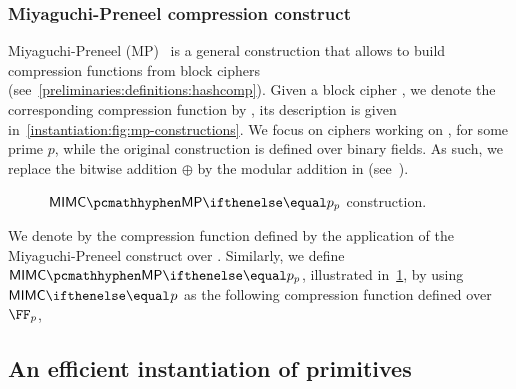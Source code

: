 \subsubsection{Miyaguchi-Preneel compression construct}

Miyaguchi-Preneel (MP)~\cite[$f_3$ function]{black2002black} is a general construction that allows to build compression functions from block ciphers (see~\cref{preliminaries:definitions:hashcomp}). Given a block cipher \Enc, we denote the corresponding compression function by \fMP{}, its description is given in~\cref{instantiation:fig:mp-constructions}. We focus on ciphers working on , for some prime $p$, while the original construction is defined over binary fields. As such, we replace the bitwise addition $\oplus$ by the modular addition in \FFx{\rBN} (see~\cite{mp-security-ethsnarks}).

\begin{figure*}[ht]
    \begin{minipage}[t]{0.50\textwidth}
        \caption{\MP{} construct in $\FFx{p}$.}\label{instantiation:fig:mp-constructions}
    \end{minipage}%
    \begin{minipage}[t]{0.50\textwidth}
    \caption{$\mimcMPPrime{p}$ construction.}\label{instantiation:fig:mimc-mp-constructions}
    \end{minipage}%
\end{figure*}

We denote by \mimcMP{} the compression function defined by the application of the Miyaguchi-Preneel construct over \mimc{}. Similarly, we define $\mimcMPPrime{p}$, illustrated in~\cref{instantiation:fig:mimc-mp-constructions}, by using $\mimcPrime{p}$ as the following compression function defined over $\FFx{p}$,

\subsection{An efficient instantiation of \mimc{} primitives}\label{instantiation:mkhash:efficient-instance}

